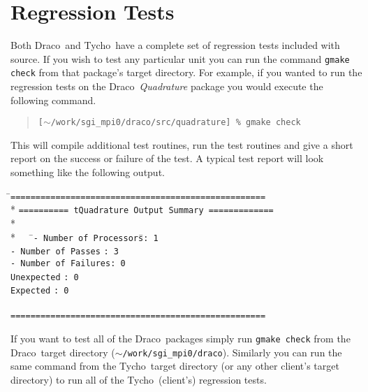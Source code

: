 \documentclass[11pt]{nmemo}
\newcommand{\comp}[1]{\normalfont\normalsize\texttt{#1}}
\newcommand{\draco}{{\normalfont\sffamily Draco}}
\newcommand{\tycho}{{\normalfont\sffamily Tycho}}
\begin{document}

\section{Regression Tests}
\label{regression}

Both \draco\ and \tycho\ have a complete set of regression tests
included with source.  If you wish to test any particular unit you can
run the command \comp{gmake check} from that package's target
directory.  For example, if you wanted to run the regression tests on
the \draco\ \emph{Quadrature} package you would execute the following
command.

\begin{verse}
\texttt{[$\sim$/work/sgi\_mpi0/draco/src/quadrature] \% gmake check}
\end{verse}

This will compile additional test routines, run the test routines
and give a short report on the success or failure of the test.  A
typical test report will look something like the following output.

\begin{tabbing}
\hspace{0.5in}\=\comp{===================================================}\\*
\+\>\comp{========== tQuadrature Output Summary =============}\\*
\ \\*
\ \ \ \=\comp{- Number of Processors}\hspace{0.5in}\=\comp{:\ 1}\\
\>\comp{- Number of Passes}\>  \comp{:\ 3}\\
\>\comp{- Number of Failures}\>\comp{:\ 0}\\
\>\hspace{0.95in}\comp{Unexpected}\>          \comp{:\ 0}\\
\>\hspace{0.95in}\comp{Expected}\>            \comp{:\ 0}\\
\ \\
\comp{===================================================}

\end{tabbing}


If you want to test all of the \draco\ packages simply run 
\comp{gmake check} from the \draco\ target directory
(\comp{$\sim$/work/sgi\_mpi0/draco}).  Similarly you can run the same
command from the \tycho\ target directory (or any other client's
target directory) to run all of the \tycho\ (client's)
regression tests.
\end{document}
